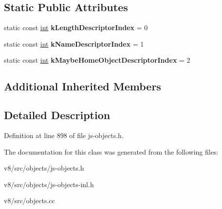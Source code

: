 \subsection*{Static Public Attributes}
\begin{DoxyCompactItemize}
\item 
\mbox{\label{classv8_1_1internal_1_1JSFunction_a3ca09eb0d65b51f0f09be8bd1d5b5632}} 
static const \mbox{\hyperlink{classint}{int}} {\bfseries k\+Length\+Descriptor\+Index} = 0
\item 
\mbox{\label{classv8_1_1internal_1_1JSFunction_a040a5c86f0e63b40a4ccb36df16fc620}} 
static const \mbox{\hyperlink{classint}{int}} {\bfseries k\+Name\+Descriptor\+Index} = 1
\item 
\mbox{\label{classv8_1_1internal_1_1JSFunction_adb5bb7d45dce5f09ec59b0ddbd0302e7}} 
static const \mbox{\hyperlink{classint}{int}} {\bfseries k\+Maybe\+Home\+Object\+Descriptor\+Index} = 2
\end{DoxyCompactItemize}
\subsection*{Additional Inherited Members}


\subsection{Detailed Description}


Definition at line 898 of file js-\/objects.\+h.



The documentation for this class was generated from the following files\+:\begin{DoxyCompactItemize}
\item 
v8/src/objects/js-\/objects.\+h\item 
v8/src/objects/js-\/objects-\/inl.\+h\item 
v8/src/objects.\+cc\end{DoxyCompactItemize}
